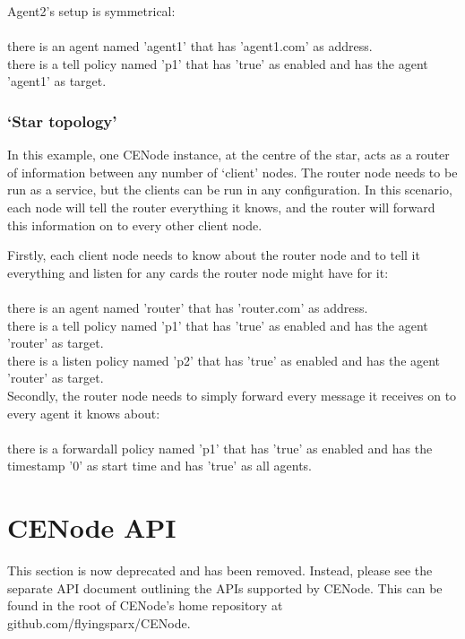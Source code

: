 \documentclass{scrartcl}
\newcommand{\ce}[1]{\textsf{#1}}
\begin{document}
Agent2's setup is symmetrical:\\
\\\ce{there is an agent named 'agent1' that has 'agent1.com' as address.\\
there is a tell policy named 'p1' that has 'true' as enabled and has the agent 'agent1' as target.}\\


\subsubsection{`Star topology'}
In this example, one CENode instance, at the centre of the star, acts as a router of information between any number of `client' nodes. The router node needs to be run as a service, but the clients can be run in any configuration. In this scenario, each node will tell the router everything it knows, and the router will forward this information on to every other client node.

Firstly, each client node needs to know about the router node and to tell it everything and listen for any cards the router node might have for it:\\
\\\ce{there is an agent named 'router' that has 'router.com' as address.\\
there is a tell policy named 'p1' that has 'true' as enabled and has the agent 'router' as target.\\
there is a listen policy named 'p2'  that has 'true' as enabled and has the agent 'router' as target.}\\

Secondly, the router node needs to simply forward every message it receives on to every agent it knows about:\\
\\\ce{there is a forwardall policy named 'p1' that has 'true' as enabled and has the timestamp '0' as start time and has 'true' as all agents.}


\section{CENode API}
\label{api}
\begin{emph}
This section is now deprecated and has been removed. Instead, please see the separate API document outlining the APIs supported by CENode. This can be found in the root of CENode's home repository at github.com/flyingsparx/CENode.
\end{emph}



\end{document}
